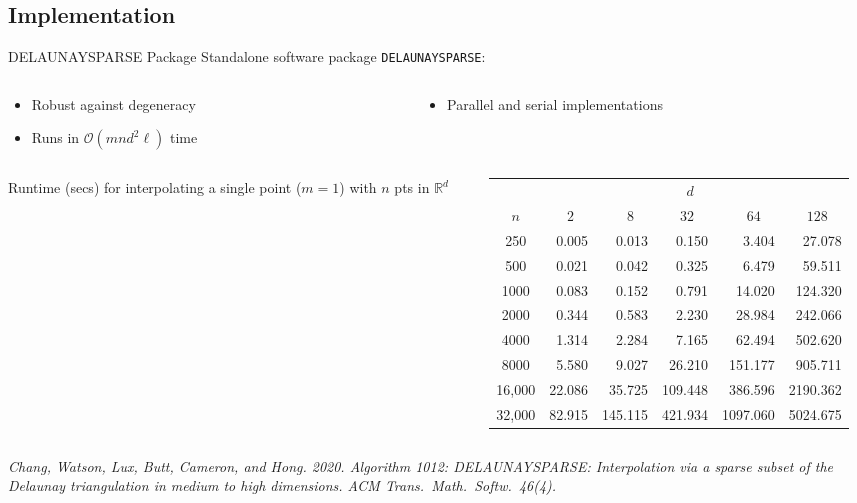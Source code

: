 \documentclass[aspectratio=169]{beamer}
\begin{document}
\subsection{Implementation}
\begin{frame}{DELAUNAYSPARSE Package}
Standalone software package {\tt DELAUNAYSPARSE}:
\begin{columns}
\begin{column}{.5\textwidth}
\begin{itemize}
\item Robust against degeneracy
\item Runs in $\mathcal{O}(m n d^2 \ell)$ time
\end{itemize}
\end{column}
\begin{column}{.5\textwidth}
\begin{itemize}
\item Parallel and serial implementations
\end{itemize}
\end{column}
\end{columns}
\begin{columns}
\begin{column}{.15\textwidth}
Runtime (secs) for interpolating a single point ($m=1$) with $n$ pts
in $\mathbb{R}^d$
\end{column}
\begin{column}{.8\textwidth}
{\small
\begin{center}
\begin{tabular}{c|rrrrr}
& & & $d\quad$ & & \\
$n$ & $2\quad$ & $8\quad$ & $32\quad$ & $64\quad$ & $128\quad$ \\
\hline
250    & 0.005  & 0.013   & 0.150   & 3.404    & 27.078   \\
500    & 0.021  & 0.042   & 0.325   & 6.479    & 59.511   \\
1000   & 0.083  & 0.152   & 0.791   & 14.020   & 124.320  \\
2000   & 0.344  & 0.583   & 2.230   & 28.984   & 242.066  \\
4000   & 1.314  & 2.284   & 7.165   & 62.494   & 502.620  \\
8000   & 5.580  & 9.027   & 26.210  & 151.177  & 905.711  \\
16,000 & 22.086 & 35.725  & 109.448 & 386.596  & 2190.362 \\
32,000 & 82.915 & 145.115 & 421.934 & 1097.060 & 5024.675 \\
\end{tabular}
\end{center}
}
\end{column}
\end{columns}
\vfill
{\tiny \it Chang, Watson, Lux, Butt, Cameron, and Hong. 2020.
Algorithm 1012: DELAUNAYSPARSE: Interpolation via a sparse subset of the
Delaunay triangulation in medium to high dimensions.
ACM Trans.\ Math.\ Softw.\ 46(4).}
\end{frame}
\end{document}
